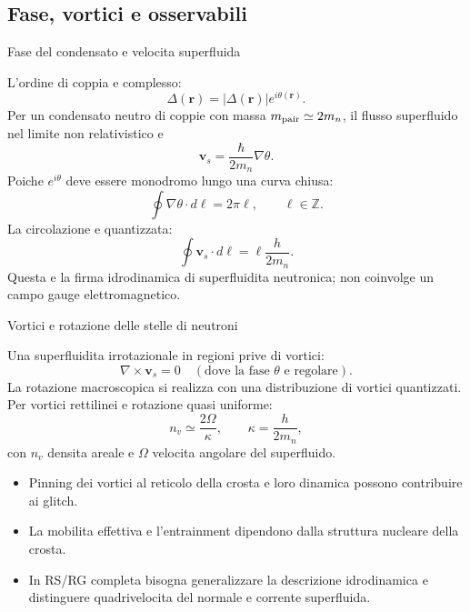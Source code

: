 \subsection{Fase, vortici e osservabili}

\begin{frame}[t]{Fase del condensato e velocita superfluida}
\vspace*{3mm}
\small

L'ordine di coppia e complesso:
\[
\Delta(\mathbf r)=|\Delta(\mathbf r)|e^{i\theta(\mathbf r)}.
\]
Per un condensato neutro di coppie con massa $m_{\rm pair}\simeq2m_n$, il flusso superfluido nel limite non relativistico e
\[
\boxed{\mathbf v_s=\frac{\hbar}{2m_n}\nabla\theta.}
\]
Poiche $e^{i\theta}$ deve essere monodromo lungo una curva chiusa:
\[
\oint\nabla\theta\cdot d\boldsymbol\ell=2\pi\ell,
\qquad\ell\in\mathbb Z.
\]
La circolazione e quantizzata:
\[
\boxed{\oint\mathbf v_s\cdot d\boldsymbol\ell=
\ell\frac h{2m_n}.}
\]
Questa e la firma idrodinamica di superfluidita neutronica; non coinvolge un campo gauge elettromagnetico.
\end{frame}

\begin{frame}[t]{Vortici e rotazione delle stelle di neutroni}
\vspace*{3mm}
\small

Una superfluidita irrotazionale in regioni prive di vortici:
\[
\nabla\times\mathbf v_s=0\quad
(\text{dove la fase }\theta\text{ e regolare}).
\]
La rotazione macroscopica si realizza con una distribuzione di vortici quantizzati. Per vortici rettilinei e rotazione quasi uniforme:
\[
\boxed{n_v\simeq\frac{2\Omega}{\kappa},\qquad
\kappa=\frac{h}{2m_n},}
\]
con $n_v$ densita areale e $\Omega$ velocita angolare del superfluido.
\begin{itemize}
\item Pinning dei vortici al reticolo della crosta e loro dinamica possono contribuire ai glitch.
\item La mobilita effettiva e l'entrainment dipendono dalla struttura nucleare della crosta.
\item In RS/RG completa bisogna generalizzare la descrizione idrodinamica e distinguere quadrivelocita del normale e corrente superfluida.
\end{itemize}
\end{frame}

